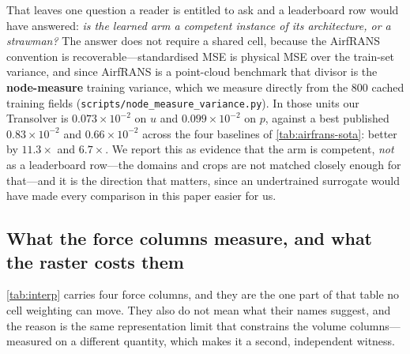 That leaves one question a reader is entitled to ask and a leaderboard row would have
answered: \emph{is the learned arm a competent instance of its architecture, or a
strawman?} The answer does not require a shared cell, because the AirfRANS convention is
recoverable---standardised MSE is physical MSE over the train-set variance, and since
AirfRANS is a point-cloud benchmark that divisor is the \textbf{node-measure} training
variance, which we measure directly from the $800$ cached training fields
(\texttt{scripts\slash{}node\_measure\_variance.py}). In those units our Transolver is
$0.073\times10^{-2}$ on $u$ and $0.099\times10^{-2}$ on $p$, against a best published
$0.83\times10^{-2}$ and $0.66\times10^{-2}$ across the four baselines of
\autoref{tab:airfrans-sota}: better by $11.3\times$ and $6.7\times$. We report this as
evidence that the arm is competent, \emph{not} as a leaderboard row---the domains and
crops are not matched closely enough for that---and it is the direction that matters, since
an undertrained surrogate would have made every comparison in this paper easier for us.

\subsection{What the force columns measure, and what the raster costs them}
\label{sec:forces}

\autoref{tab:interp} carries four force columns, and they are the one part of that table
no cell weighting can move. They also do not mean what their names suggest, and the reason
is the same representation limit that constrains the volume columns---measured on a different
quantity, which makes it a second, independent witness.

